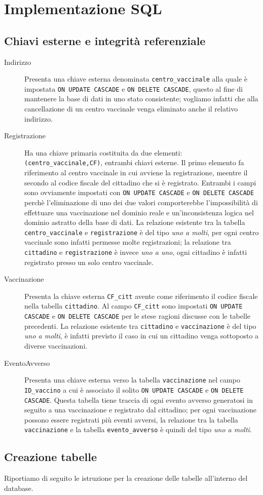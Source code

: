 \section{Implementazione SQL}

\subsection{Chiavi esterne e integrità referenziale}

	\begin{description}
		\item[Indirizzo]
			Presenta una chiave esterna denominata \verb|centro_vaccinale| alla quale è impostata \verb|ON UPDATE CASCADE| e \verb|ON DELETE CASCADE|, questo al fine di mantenere la base di dati in uno stato consistente; vogliamo infatti che alla cancellazione di un centro vaccinale venga eliminato anche il relativo indirizzo.
		
		\item[Registrazione]
			Ha una chiave primaria costituita da due elementi: \verb|(centro_vaccinale,CF)|, entrambi chiavi esterne.
			Il primo elemento fa riferimento al centro vaccinale in cui avviene la registrazione, meentre il secondo al codice fiscale del cittadino che si è registrato.
			Entrambi i campi sono ovviamente impostati con \verb|ON UPDATE CASCADE| e \verb|ON DELETE CASCADE| perchè l'eliminazione di uno dei due valori comporterebbe l'impossibilità di effettuare una vaccinazione nel dominio reale e un'inconsistenza logica nel dominio astratto della base di dati.
			La relazione esistente tra la tabella \verb|centro_vaccinale| e \verb|registrazione| è del tipo \emph{uno a molti}, per ogni centro vaccinale sono infatti permesse molte registrazioni;
			la relazione tra \verb|cittadino| e \verb|registrazione| è invece \emph{uno a uno}, ogni cittadino è infatti registrato presso un solo centro vaccinale.
		
		\item[Vaccinazione]
			Presenta la chiave esterna \verb|CF_citt| avente come riferimento il codice fiscale nella tabella \verb|cittadino|.
			Al campo \verb|CF_citt| sono impostati \verb|ON UPDATE CASCADE| e \verb|ON DELETE CASCADE| per le stese ragioni discusse con le tabelle precedenti.
			La relazione esistente tra \verb|cittadino| e \verb|vaccinazione| è del tipo \emph{uno a molti}, è infatti previsto il caso in cui un cittadino venga sottoposto a diverse vaccinazioni.		
		
		\item[EventoAvverso]
			Presenta una chiave esterna verso la tabella \verb|vaccinazione| nel campo \verb|ID_vaccino| a cui è associato il solito \verb|ON UPDATE CASCADE| e \verb|ON DELETE CASCADE|.
			Questa tabella tiene traccia di ogni evento avverso generatosi in seguito a una vaccinazione e registrato dal cittadino; per ogni vaccinazione possono essere registrati più eventi avversi, la relazione tra la tabella \verb|vaccinazione| e la tabella \verb|evento_avverso| è quindi del tipo \emph{uno a molti}.
	\end{description}

\subsection{Creazione tabelle}

	Riportiamo di seguito le istruzione per la creazione delle tabelle all'interno del database.

	